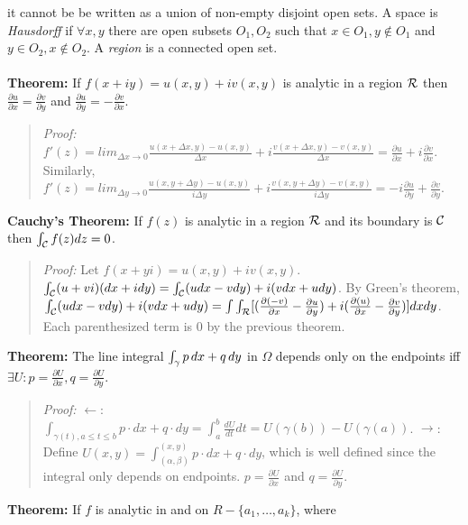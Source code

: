 it cannot be be written as a union of non-empty disjoint open sets.  A space is \emph{Hausdorff} if
$\forall x, y$ there are open subsets $O_1, O_2$ such that
$x \in O_1, y \notin O_1$ and
$y \in O_2, x \notin O_2$.
A \emph{region} is a connected open set.
\\
\\
{\bf Theorem:}
If $f(x+iy)= u(x,y)+ i v(x,y)$ is analytic in a region ${\cal R}$ then
${\frac {\partial u} {\partial x}}= {\frac {\partial v} {\partial y}}$
and ${\frac {\partial u} {\partial y}}= -{\frac {\partial v} {\partial x}}$.
\begin{quote}
\emph{Proof:}
$f'(z) = lim_{\Delta x \rightarrow 0} 
{\frac {u(x+\Delta x, y)-u(x,y)}{\Delta x}} + i {\frac {v(x+\Delta x, y)-v(x,y)}{\Delta x}}=
{\frac {\partial u} {\partial x}} + i {\frac {\partial v} {\partial x}}$.  Similarly,
$f'(z) = lim_{\Delta y \rightarrow 0} 
{\frac {u(x, y + \Delta y)-u(x,y)}{i \Delta y}} + 
i {\frac {v(x, y+ \Delta y)-v(x,y)}{i \Delta y}}=
-i {\frac {\partial u} {\partial y}} + {\frac {\partial v} {\partial y}}$. 
\end{quote}
{\bf Cauchy's Theorem:} If $f(z)$ is analytic in a region ${\cal R}$ and
its boundary is ${\cal C}$ then $\int_{\cal C} f(z) dz = 0$.
\begin{quote}
\emph{Proof:}
Let $f(x+yi)= u(x,y)+ i v(x,y)$.  $
\int_{\cal C} (u+vi)(dx+idy)=
\int_{\cal C} (udx-vdy) + i(v dx + u dy)$.  By Green's theorem,
$\int_{\cal C} (udx-vdy) + i(v dx + u dy)= \int \int_{\cal R}  [
({\frac {\partial (-v)} {\partial x}} - {\frac {\partial u} {\partial y}}) +
i({\frac {\partial (u)} {\partial x}} - {\frac {\partial v} {\partial y}}) ]
dx dy$.  Each parenthesized term is $0$ by the previous theorem.
\end{quote}
{\bf Theorem:}  
The line integral $\int_{\gamma} p \thinspace dx + q \thinspace dy$ in $\Omega$ depends only on the
endpoints iff 
$\exists U: p= {\frac {\partial U}{\partial x}}, q= {\frac {\partial U}{\partial y}}$.
\begin{quote}
\emph{Proof:}
$\leftarrow$: $\int_{\gamma(t), a \leq t \leq b} p \cdot dx + q \cdot dy =
\int_a^b {\frac {dU} {dt}} dt = U(\gamma(b)) - U(\gamma(a))$.
$\rightarrow$: Define $U(x,y) = \int_{(\alpha, \beta)}^{(x, y)} p \cdot dx + q \cdot dy$,
which is well defined since the integral only depends on endpoints.
$p = {\frac {\partial U} {\partial x}}$ and 
$q = {\frac {\partial U} {\partial y}}$.
\end{quote}
{\bf Theorem:}  
If $f$ is analytic in and on $R- \{ a_1 , \ldots , a_k \}$, where
